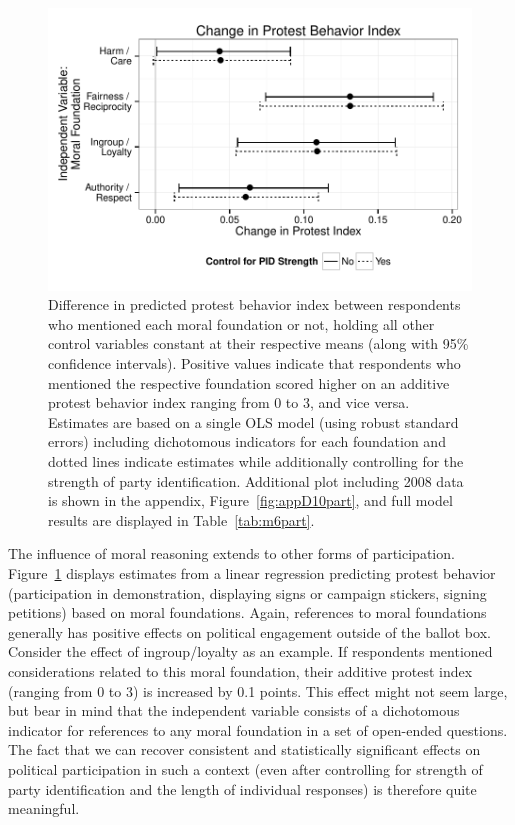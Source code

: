 \documentclass[12pt]{article}
\begin{document}
\begin{figure}[h]\centering
\includegraphics[scale=.9]{../calc/fig/fig6part.pdf}
\caption{Difference in predicted protest behavior index between respondents who mentioned each moral foundation or not, holding all other control variables constant at their respective means (along with 95\% confidence intervals). Positive values indicate that respondents who mentioned the respective foundation scored higher on an additive protest behavior index ranging from 0 to 3, and vice versa. Estimates are based on a single OLS model (using robust standard errors) including dichotomous indicators for each foundation and dotted lines indicate estimates while additionally controlling for the strength of party identification. Additional plot including 2008 data is shown in the appendix, Figure~\ref{fig:appD10part}, and full model results are displayed in Table~\ref{tab:m6part}.}\label{fig:6part}
\end{figure}

The influence of moral reasoning extends to other forms of participation. Figure~\ref{fig:6part} displays estimates from a linear regression predicting protest behavior (participation in demonstration, displaying signs or campaign stickers, signing petitions) based on moral foundations. Again, references to moral foundations generally has positive effects on political engagement outside of the ballot box. Consider the effect of ingroup/loyalty as an example. If respondents mentioned considerations related to this moral foundation, their additive protest index (ranging from 0 to 3) is increased by 0.1 points. This effect might not seem large, but bear in mind that the independent variable consists of a dichotomous indicator for references to any moral foundation in a set of open-ended questions. The fact that we can recover consistent and statistically significant effects on political participation in such a context (even after controlling for strength of party identification and the length of individual responses) is therefore quite meaningful.
\end{document}
